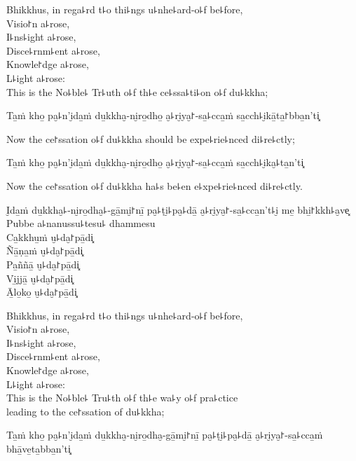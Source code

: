 \begin{english}
  Bhikkhus, in rega꜕rd t꜕o thi꜕ngs u꜕nhe꜕ard-o꜕f be꜕fore,\\
  Visio꜓n a꜕rose,\\
  I꜕ns꜕ight a꜕rose,\\
  Disce꜕rnm꜕ent a꜕rose,\\
  Knowle꜓dge a꜕rose,\\
  L꜕ight a꜕rose:\\
  This is the No꜕ble꜕ Tr꜕uth o꜕f th꜕e ce꜕ssa꜕ti꜕on o꜕f du꜕kkha;
\end{english}

Ta̱ṁ kho̱ pa̮꜕n'i̮da̱ṁ du̱kkha̮-ni̮ro̱dho̱ a̮꜕ri̮ya̮꜓-sa̱꜕cca̱ṁ sa̱cch꜕i̮kā̱ta̱꜓bba̱n'ti͓

\begin{english}
  Now the ce꜓ssation o꜕f du꜕kkha should be expe꜕rie꜕nced di꜕re꜕ctly;
\end{english}

Ta̱ṁ kho̱ pa̮꜕n'i̮da̱ṁ du̱kkha̮-ni̮ro̱dho̱ a̮꜕ri̮ya̮꜓-sa̱꜕cca̱ṁ sa̱cch꜕i̮ka̮꜕ta̱n'ti͓

\begin{english}
  Now the ce꜓ssation o꜕f du꜕kkha ha꜕s be꜕en e꜕xpe꜕rie꜕nced di꜕re꜕ctly.
\end{english}

I̮da̱ṁ du̱kkha̮꜕-ni̮ro̱dha̮꜕-gā̱mi̮꜓nī̱ pa̮꜕ṭi̮꜕pa̮꜕dā̱ a̮꜕ri̮ya̮꜓-sa̱꜕cca̱n't꜕i̮ me̱ bhi̱꜓kkh꜕a̮ve͓\\
Pubbe a꜕nanussu꜕tesu꜕ dhammesu\\
Ca̱kkhu̱ṁ u̮꜕da̮꜓pā̱di͓\\
Ñā̱ṇa̱ṁ u̮꜕da̮꜓pā̱di͓\\
Pa̱ññā̱ u̮꜕da̮꜓pā̱di͓\\
Vi̱jjā̱ u̮꜕da̮꜓pā̱di͓\\
Ā̱lo̱ko̱ u̮꜕da̮꜓pā̱di͓

\begin{english}
  Bhikkhus, in rega꜕rd t꜕o thi꜕ngs u꜕nhe꜕ard-o꜕f be꜕fore,\\
  Visio꜓n a꜕rose,\\
  I꜕ns꜕ight a꜕rose,\\
  Disce꜕rnm꜕ent a꜕rose,\\
  Knowle꜓dge a꜕rose,\\
  L꜕ight a꜕rose:\\
  \ifaivedition
  \clearpage
  \fi
  This is the No꜕ble꜕ Tru꜕th o꜕f th꜕e wa꜕y o꜕f pra꜕ctice\\
  leading to the ce꜓ssation of du꜕kkha;
\end{english}

Ta̱ṁ kho̱ pa̮꜕n'i̮da̱ṁ du̱kkha̮-ni̮ro̱dha̮-gā̱mi̮꜓nī̱ pa̮꜕ṭi̮꜕pa̮꜕dā̱ a̮꜕ri̮ya̮꜓-sa̱꜕cca̱ṁ bhā̱ve̱ta̱bba̱n'ti͓

